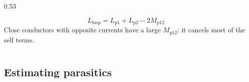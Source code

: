 \begin{frame}
\begin{columns}[T]
\begin{column}{0.53\textwidth}
\begin{itemize}
				      \begin{equation*}
					      L_\mathrm{loop}=L_\mathrm{p1}+L_\mathrm{p2}-2M_\mathrm{p12}
				      \end{equation*}
				      Close conductors with opposite currents have a large $M_\mathrm{p12}$: it cancels most of the self terms.
			\end{itemize}
		\end{column}
	\end{columns}
\end{frame}

\subsection{Estimating parasitics}

